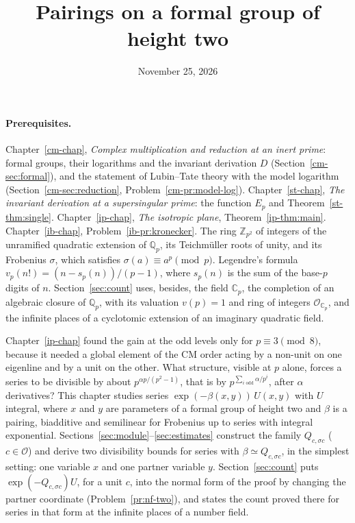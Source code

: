 \documentclass[reqno]{amsart}
\title{Pairings on a formal group of height two}
\author{}
\date{November 25, 2026}
\newcounter{chap}
\theoremstyle{definition}
\theoremstyle{plain}
\newcommand{\Z}{\mathbb{Z}}
\newcommand{\Q}{\mathbb{Q}}
\newcommand{\Oc}{\mathcal{O}}
\newcommand{\C}{\mathbb{C}}
\newcommand{\Op}{\mathcal{O}_{\C_p}}
\begin{document}
\maketitle
{}\label{chap}

\paragraph{Prerequisites.}
Chapter~\ref{cm-chap}, \emph{Complex multiplication and reduction at an inert prime}: formal groups, their logarithms and the invariant derivation \(D\) (Section~\ref{cm-sec:formal}), and the statement of Lubin--Tate theory with the model logarithm (Section~\ref{cm-sec:reduction}, Problem~\ref{cm-pr:model-log}).  Chapter~\ref{st-chap}, \emph{The invariant derivation at a supersingular prime}: the function \(E_p\) and Theorem~\ref{st-thm:single}.  Chapter~\ref{ip-chap}, \emph{The isotropic plane}, Theorem~\ref{ip-thm:main}.  Chapter~\ref{ib-chap}, Problem~\ref{ib-pr:kronecker}.  The ring \(\Z_{p^2}\) of integers of the unramified quadratic extension of \(\Q_p\), its Teichm\"uller roots of unity, and its Frobenius \(\sigma\), which satisfies \(\sigma(a) \equiv a^p \pmod p\).  Legendre's formula \(v_p(n!) = (n - s_p(n))/(p-1)\), where \(s_p(n)\) is the sum of the base-\(p\) digits of \(n\).  Section~\ref{sec:count} uses, besides, the field \(\C_p\), the completion of an algebraic closure of \(\Q_p\), with its valuation \(v(p) = 1\) and ring of integers \(\Op\), and the infinite places of a cyclotomic extension of an imaginary quadratic field.

\medskip
Chapter~\ref{ip-chap} found the gain at the odd levels only for \(p \equiv 3 \pmod 8\), because it needed a global element of the CM order acting by a non-unit on one eigenline and by a unit on the other.  What structure, visible at \(p\) alone, forces a series to be divisible by about \(p^{\alpha p/(p^2-1)}\), that is by \(p^{\sum_{i \text{ odd}} \alpha/p^i}\), after \(\alpha\) derivatives?  This chapter studies series \(\exp(-\beta(x,y))\,U(x,y)\) with \(U\) integral, where \(x\) and \(y\) are parameters of a formal group of height two and \(\beta\) is a pairing, biadditive and semilinear for Frobenius up to series with integral exponential.  Sections~\ref{sec:module}--\ref{sec:estimates} construct the family \(Q_{c,\sigma c}\) (\(c \in \Oc\)) and derive two divisibility bounds for series with \(\beta \simeq Q_{c,\sigma c}\), in the simplest setting: one variable \(x\) and one partner variable \(y\).  Section~\ref{sec:count} puts \(\exp(-Q_{c,\sigma c})U\), for a unit \(c\), into the normal form of the proof \cite{GL} by changing the partner coordinate (Problem~\ref{pr:nf-two}), and states the count proved there for series in that form at the infinite places of a number field.
\end{document}
